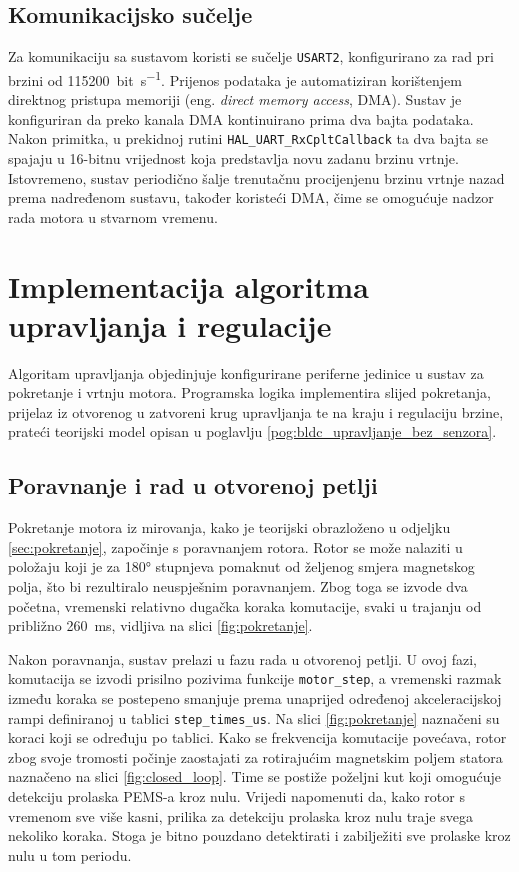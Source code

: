 \documentclass[diplomskirad]{fer}
\begin{document}
\subsection{Komunikacijsko sučelje}
\label{ssec:komunikacija}

Za komunikaciju sa sustavom koristi se sučelje \texttt{USART2}, konfigurirano
za rad pri brzini od \SI{115200}{bit\per\second}. Prijenos podataka je
automatiziran korištenjem direktnog pristupa memoriji (eng. \textit{direct
	memory access}, DMA). Sustav je konfiguriran da preko kanala DMA kontinuirano
prima dva bajta podataka. Nakon primitka, u prekidnoj rutini
\texttt{HAL\_UART\_RxCpltCallback} ta dva bajta se spajaju u 16-bitnu
vrijednost koja predstavlja novu zadanu brzinu vrtnje. Istovremeno, sustav
periodično šalje trenutačnu procijenjenu brzinu vrtnje nazad prema nadređenom
sustavu, također koristeći DMA, čime se omogućuje nadzor rada motora u stvarnom
vremenu.

\section{Implementacija algoritma upravljanja i regulacije}
\label{sec:implementacija_algoritma_i_regulacije}

Algoritam upravljanja objedinjuje konfigurirane periferne jedinice u sustav za
pokretanje i vrtnju motora. Programska logika implementira slijed pokretanja,
prijelaz iz otvorenog u zatvoreni krug upravljanja te na kraju i regulaciju
brzine, prateći teorijski model opisan u poglavlju
\ref{pog:bldc_upravljanje_bez_senzora}.

\subsection{Poravnanje i rad u otvorenoj petlji}
\label{ssec:pokretanje_motora}

Pokretanje motora iz mirovanja, kako je teorijski obrazloženo u odjeljku
\ref{sec:pokretanje}, započinje s poravnanjem rotora. Rotor se može nalaziti u
položaju koji je za \ang{180} stupnjeva pomaknut od željenog smjera magnetskog
polja, što bi rezultiralo neuspješnim poravnanjem. Zbog toga se izvode dva
početna, vremenski relativno dugačka koraka komutacije, svaki u trajanju od
približno \SI{260}{\milli\second}, vidljiva na slici \ref{fig:pokretanje}.

Nakon poravnanja, sustav prelazi u fazu rada u otvorenoj petlji. U ovoj fazi,
komutacija se izvodi prisilno pozivima funkcije \texttt{motor\_step}, a
vremenski razmak između koraka se postepeno smanjuje prema unaprijed određenoj
akceleracijskoj rampi definiranoj u tablici \texttt{step\_times\_us}. Na slici
\ref{fig:pokretanje} naznačeni su koraci koji se određuju po tablici. Kako se
frekvencija komutacije povećava, rotor zbog svoje tromosti počinje zaostajati
za rotirajućim magnetskim poljem statora naznačeno na slici
\ref{fig:closed_loop}. Time se postiže poželjni kut koji omogućuje detekciju
prolaska PEMS-a kroz nulu. Vrijedi napomenuti da, kako rotor s vremenom sve
više kasni, prilika za detekciju prolaska kroz nulu traje svega nekoliko
koraka. Stoga je bitno pouzdano detektirati i zabilježiti sve prolaske kroz
nulu u tom periodu.
\end{document}
